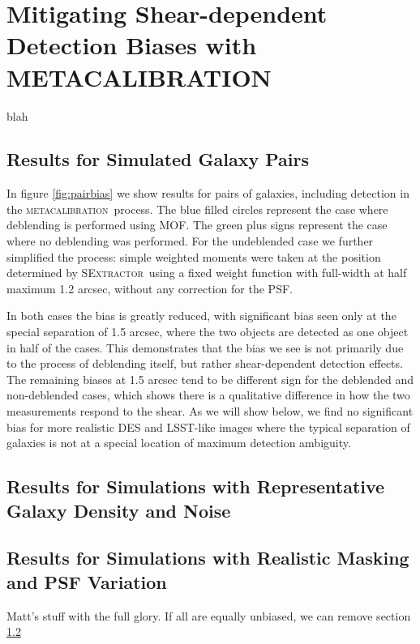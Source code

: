 \documentclass[fleqn,useAMS,usenatbib]{mnras}
\newcommand{\mcal}{\textsc{metacalibration}}
\newcommand{\sx}{\textsc{SExtractor}}
\begin{document}
\section{Mitigating Shear-dependent Detection Biases with \textsc{METACALIBRATION}}
blah

\subsection{Results for Simulated Galaxy Pairs} \label{sec:mdetpairs}

In figure \ref{fig:pairbias} we show results for pairs of galaxies, including
detection in the \mcal\ process.   The blue filled circles represent the case
where deblending is performed using MOF.  The green plus signs represent the
case where no deblending was performed. For the undeblended case we further
simplified the process:  simple weighted moments were taken at the position
determined by \sx\ using a fixed weight function with full-width at half maximum
1.2 arcsec, without any correction for the PSF.

In both cases the bias is greatly reduced, with significant bias seen only at
the special separation of 1.5 arcsec, where the two objects are detected as one
object in half of the cases.  This demonstrates that the bias we see is not
primarily due to the process of deblending itself, but rather shear-dependent
detection effects.  The remaining biases at 1.5 arcsec tend to be different
sign for the deblended and non-deblended cases, which shows there is a
qualitative difference in how the two measurements respond to the shear. As we
will show below, we find no significant bias for more realistic DES and
LSST-like images where the typical separation of galaxies is not at a special
location of maximum detection ambiguity.

\subsection{Results for Simulations with Representative Galaxy Density and Noise}
\label{sec:res:constpsf}


\subsection{Results for Simulations with Realistic Masking and PSF Variation}
\label{sec:res:varpsf}

Matt's stuff with the full glory.  If all are equally unbiased, we can remove
section \ref{sec:res:constpsf}
\end{document}
